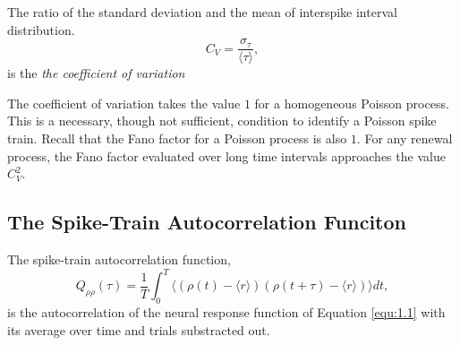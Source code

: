 \begin{defn}
    The ratio of the standard deviation and the mean of interspike interval distribution.
    \begin{equation}
        C_V=\frac{\sigma_\tau}{\langle \tau  \rangle},
        \label{equ:1.34}
    \end{equation} is the \emph{the coefficient of variation}
\end{defn}

\begin{rem}
    The coefficient of variation takes the value $1$ for a homogeneous Poisson process. This is a necessary,  though not sufficient, condition to identify a Poisson spike train. Recall that the Fano factor for a Poisson process is also $1$. For any renewal process, the Fano factor evaluated over long time intervals approaches the value $C^2_V$.
\end{rem}

\subsection{The Spike-Train Autocorrelation Funciton}

\begin{defn}
        The spike-train autocorrelation function,
        \begin{equation}
            Q_{\rho\rho}(\tau)=\frac{1}{T}\int^T_0 \langle (\rho(t)-\langle r \rangle)(\rho(t+\tau)-\langle r\rangle)\rangle dt,
            \label{equ:1.35}
        \end{equation} is the autocorrelation of the neural response function of Equation \ref{equ:1.1} with its average over time and trials substracted out. 
\end{defn}

